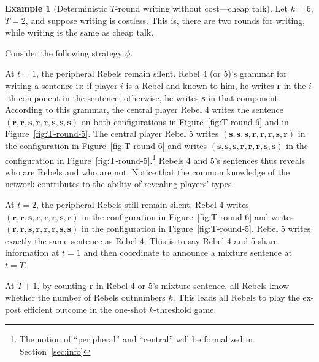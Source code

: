 \documentclass[12pt,letter]{article}
\theoremstyle{definition}
\newtheorem{example}{Example}
\theoremstyle{remark}
\theoremstyle{claim}
\begin{document}
%
\begin{example}[Deterministic $T$-round writing without cost---cheap talk]
\label{ex:cheap_talk}
Let $k=6$, $T=2$, and suppose writing is costless. This is, there are two rounds for writing, while writing is the same as cheap talk.

Consider the following strategy $\phi$. 

At $t=1$, the peripheral Rebels remain silent. Rebel 4 (or 5)'s grammar for writing a sentence is: if player $i$ is a Rebel and known to him, he writes \textbf{r} in the $i$-th component in the sentence; otherwise, he writes \textbf{s} in that component. According to this grammar, the central player Rebel 4 writes the sentence $(\textbf{r},\textbf{r},\textbf{s},\textbf{r},\textbf{r},\textbf{s},\textbf{s},\textbf{s})$ on both configurations in Figure~\ref{fig:T-round-6} and in Figure~\ref{fig:T-round-5}. The central player Rebel 5 writes $(\textbf{s},\textbf{s},\textbf{s},\textbf{r},\textbf{r},\textbf{r},\textbf{s},\textbf{r})$ in the configuration in Figure~\ref{fig:T-round-6} and writes $(\textbf{s},\textbf{s},\textbf{s},\textbf{r},\textbf{r},\textbf{r},\textbf{s},\textbf{s})$ in the configuration in Figure~\ref{fig:T-round-5}.\footnote{The notion of ``peripheral'' and ``central'' will be formalized in Section~\ref{sec:info}} Rebels 4 and 5's sentences thus reveals who are Rebels and who are not. Notice that the common knowledge of the network contributes to the ability of revealing players' types. 

At $t=2$, the peripheral Rebels still remain silent. Rebel 4 writes $(\textbf{r},\textbf{r},\textbf{s},\textbf{r},\textbf{r},\textbf{r},\textbf{s},\textbf{r})$ in the configuration in Figure~\ref{fig:T-round-6} and writes $(\textbf{r},\textbf{r},\textbf{s},\textbf{r},\textbf{r},\textbf{r},\textbf{s},\textbf{s})$ in the configuration in Figure~\ref{fig:T-round-5}. Rebel 5 writes exactly the same sentence as Rebel 4. This is to say Rebel 4 and 5 share information at $t=1$ and then coordinate to announce a mixture sentence at $t=T$. 

At $T+1$, by counting \textbf{r} in Rebel 4 or 5's mixture sentence, all Rebels know whether the number of Rebels outnumbers $k$. This leads all Rebels to play the ex-post efficient outcome in the one-shot $k$-threshold game. 


\end{example}
\end{document}
